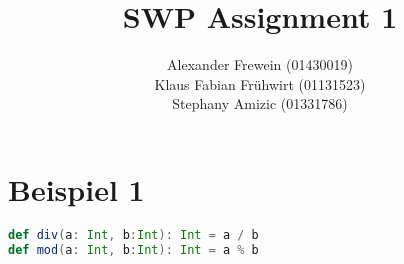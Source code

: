 \documentclass[12pt,runningheads,a4paper]{llncs}
\begin{document}
\title{SWP Assignment 1}


%
%
\author{Alexander Frewein (01430019)\\
		Klaus Fabian Frühwirt (01131523)\\
		Stephany Amizic (01331786)}

%




\maketitle




\bigskip
\bigskip
\section*{Beispiel 1}
\begin{lstlisting}[language=scala]
def div(a: Int, b:Int): Int = a / b
def mod(a: Int, b:Int): Int = a % b
\end{lstlisting}
\end{document}
